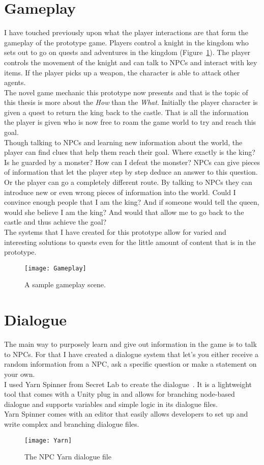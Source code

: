 \section{Gameplay}
I have touched previously upon what the player interactions are that form the gameplay of the prototype game. Players control a knight in the kingdom who sets out to go on quests and adventures in the kingdom (Figure~\ref{fig:gameplay}). The player controls the movement of the knight and can talk to NPCs and interact with key items. If the player picks up a weapon, the character is able to attack other agents.\\
The novel game mechanic this prototype now presents and that is the topic of this thesis is more about the \textit{How} than the \textit{What}. Initially the player character is given a quest to return the king back to the castle. That is all the information the player is given who is now free to roam the game world to try and reach this goal.\\
Though talking to NPCs and learning new information about the world, the player can find clues that help them reach their goal. Where exactly is the king? Is he guarded by a monster? How can I defeat the monster? NPCs can give pieces of information that let the player step by step deduce an answer to this question.\\
Or the player can go a completely different route. By talking to NPCs they can introduce new or even wrong pieces of information into the world. Could I convince enough people that I am the king? And if someone would tell the queen, would she believe I am the king? And would that allow me to go back to the castle and thus achieve the goal?\\
The systems that I have created for this prototype allow for varied and interesting solutions to quests even for the little amount of content that is in the prototype.
\begin{figure}
	\centering
	\texttt{[image: Gameplay]}
	\caption{A sample gameplay scene.}
	\label{fig:gameplay}
\end{figure}
\section{Dialogue}
The main way to purposely learn and give out information in the game is to talk to NPCs. For that I have created a dialogue system that let's you either receive a random information from a NPC, ask a specific question or make a  statement on your own.\\
I used Yarn Spinner from Secret Lab to create the dialogue~\cite{Secret2021}. It is a lightweight tool that comes with a Unity plug in and allows for branching node-based dialogue and supports variables and simple logic in its dialogue files.\\
Yarn Spinner comes with an editor that easily allows developers to set up and write complex and branching dialogue files.
\begin{figure}
	\centering
	\texttt{[image: Yarn]}
	\caption{The NPC Yarn dialogue file}
	\label{fig:yarn}
\end{figure}
